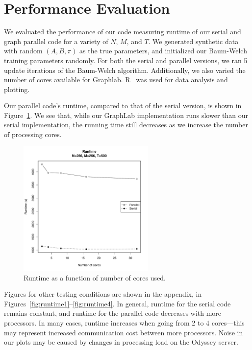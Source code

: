 \section{Performance Evaluation}

We evaluated the performance of our code measuring runtime of our serial and
graph parallel code for a variety of $N$, $M$, and $T$. We generated synthetic
data with random $(A, B, \pi)$ as the true parameters, and initialized our
Baum-Welch training parameters randomly. For both the serial and parallel
versions, we ran 5 update iterations of the Baum-Welch algorithm.  Additionally,
we also varied the number of cores available for Graphlab. R~\cite{r} was used
for data analysis and plotting. 

Our parallel code's runtime, compared to that of the serial version, is shown in
Figure~\ref{fig:runtime-256-500}. We see that, while our GraphLab implementation
runs slower than our serial implementation, the running time still decreases as
we increase the number of processing cores. 

\begin{figure}[htb]
    \centering
    \includegraphics[width=0.6\textwidth]{../figure/runtime-N_256-T_500.pdf}
    \caption{Runtime as a function of number of cores used.}
    \label{fig:runtime-256-500}
\end{figure}

Figures for other testing conditions are shown in the appendix, in
Figures~\ref{fig:runtime1}--\ref{fig:runtime4}. In general, runtime for the
serial code remains constant, and runtime for the parallel code decreases with
more processors. In many cases, runtime increases when going from 2 to 4
cores---this may represent increased communication cost between more processors.
Noise in our plots may be caused by changes in processing load on the Odyssey
server.

